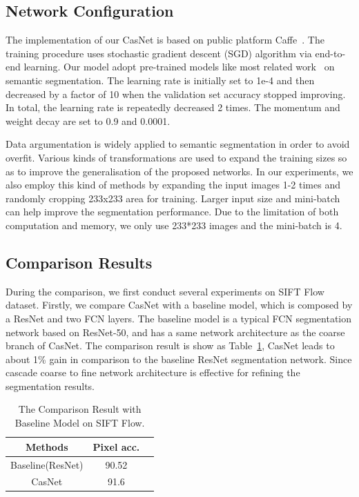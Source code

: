 \documentclass[10.5pt,compsoc]{TsT}
\newcommand{\upcite}[1]{\superscript{\textsuperscript{\cite{#1}}}}
\theoremstyle{mystyle}
\newcommand{\upcite}[1]{\textsuperscript{\cite{#1}}}
\begin{document}
{\subsection{Network Configuration}
\noindent
The implementation of our CasNet is based on public platform Caffe~\upcite{23}. The training procedure uses stochastic gradient descent (SGD) algorithm via end-to-end learning. Our model adopt pre-trained models like most related work~\cite{21} on semantic segmentation. The learning rate is initially set to 1e-4 and then decreased by a factor of 10 when the validation set accuracy stopped improving. In total, the learning rate is repeatedly decreased 2 times. The momentum and weight decay are set to 0.9 and 0.0001.

Data argumentation is widely applied to semantic segmentation in order to avoid overfit. Various kinds of transformations are used to expand the training sizes so as to improve the generalisation of the proposed networks. In our experiments, we also employ this kind of methods by expanding the input images 1-2 times and randomly cropping 233x233  area for training.  Larger input size and mini-batch can help improve the segmentation performance. Due to the limitation of both computation and memory, we only use 233*233 images and the mini-batch is 4.



\subsection{Comparison Results}
\noindent

During the comparison, we first conduct several experiments on SIFT Flow dataset.
Firstly, we compare CasNet with a baseline model, which is composed by a ResNet and two FCN layers. The baseline model is a  typical FCN segmentation network based on ResNet-50, and has a same network architecture as the coarse branch of CasNet. The comparison result is show as Table~\ref{t:self1}, CasNet leads to about 1\% gain in comparison to the baseline ResNet segmentation network. Since cascade coarse to fine network architecture is effective for refining the segmentation results.

\begin{table}[h]
\large
\setlength{\belowcaptionskip}{12pt}
\caption{The Comparison Result with Baseline Model on SIFT Flow.}
\label{t:self1}
\centering
\begin{tabular}{ccc}
\hline 
Methods & Pixel acc. \\
\hline
Baseline(ResNet) & 90.52 \\
CasNet & 91.6  \\
\hline
\end{tabular}
\end{table}

}
\end{document}
